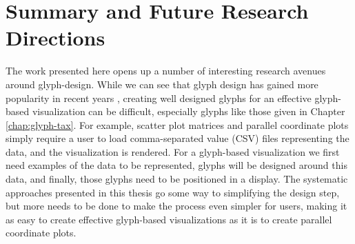 \section{Summary and Future Research Directions}

The work presented here opens up a number of interesting research avenues around glyph-design.
While we can see that glyph design has gained more popularity in recent years \cite{Polk14, kachkaev2014, CGF:Abd2013a}, creating well designed glyphs for an effective glyph-based visualization can be difficult, especially glyphs like those given in Chapter \ref{chap:glyph-tax}.
For example, scatter plot matrices and parallel coordinate plots simply require a user to load comma-separated value (CSV) files representing the data, and the visualization is rendered.
For a glyph-based visualization we first need examples of the data to be represented, glyphs will be designed around this data, and finally, those glyphs need to be positioned in a display.
The systematic approaches presented in this thesis go some way to simplifying the design step, but more needs to be done to make the process even simpler for users, making it as easy to create effective glyph-based visualizations as it is to create parallel coordinate plots.

